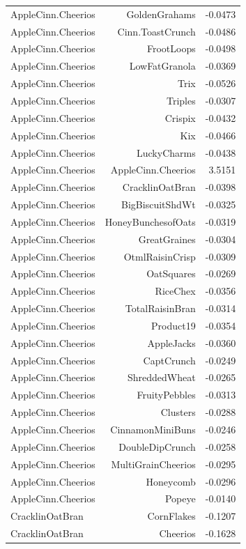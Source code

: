 \begin{longtable}{@{}lrr@{}}
AppleCinn.Cheerios & GoldenGrahams & -0.0473 \\
AppleCinn.Cheerios & Cinn.ToastCrunch & -0.0486 \\
AppleCinn.Cheerios & FrootLoops & -0.0498 \\
AppleCinn.Cheerios & LowFatGranola & -0.0369 \\
AppleCinn.Cheerios & Trix & -0.0526 \\
AppleCinn.Cheerios & Triples & -0.0307 \\
AppleCinn.Cheerios & Crispix & -0.0432 \\
AppleCinn.Cheerios & Kix & -0.0466 \\
AppleCinn.Cheerios & LuckyCharms & -0.0438 \\
AppleCinn.Cheerios & AppleCinn.Cheerios & 3.5151 \\
AppleCinn.Cheerios & CracklinOatBran & -0.0398 \\
AppleCinn.Cheerios & BigBiscuitShdWt & -0.0325 \\
AppleCinn.Cheerios & HoneyBunchesofOats & -0.0319 \\
AppleCinn.Cheerios & GreatGraines & -0.0304 \\
AppleCinn.Cheerios & OtmlRaisinCrisp & -0.0309 \\
AppleCinn.Cheerios & OatSquares & -0.0269 \\
AppleCinn.Cheerios & RiceChex & -0.0356 \\
AppleCinn.Cheerios & TotalRaisinBran & -0.0314 \\
AppleCinn.Cheerios & Product19 & -0.0354 \\
AppleCinn.Cheerios & AppleJacks & -0.0360 \\
AppleCinn.Cheerios & CaptCrunch & -0.0249 \\
AppleCinn.Cheerios & ShreddedWheat & -0.0265 \\
AppleCinn.Cheerios & FruityPebbles & -0.0313 \\
AppleCinn.Cheerios & Clusters & -0.0288 \\
AppleCinn.Cheerios & CinnamonMiniBuns & -0.0246 \\
AppleCinn.Cheerios & DoubleDipCrunch & -0.0258 \\
AppleCinn.Cheerios & MultiGrainCheerios & -0.0295 \\
AppleCinn.Cheerios & Honeycomb & -0.0296 \\
AppleCinn.Cheerios & Popeye & -0.0140 \\
CracklinOatBran & CornFlakes & -0.1207 \\
CracklinOatBran & Cheerios & -0.1628 \\

\end{longtable}
